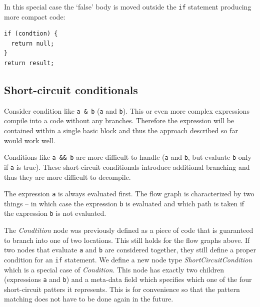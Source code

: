\documentclass[12pt,twoside,notitlepage]{report}
\begin{document}
In this special case the `false' body is moved outside the \verb|if|
statement producing more compact code:
\begin{verbatim}
if (condtion) {
  return null;
}
return result;
\end{verbatim}


\subsection{Short-circuit conditionals}

Consider condition like \verb|a & b| (\verb|a| and \verb|b|).
This or even more complex expressions compile into a code without
any branches.  Therefore the expression will be contained within
a single basic block and thus the approach described so far 
would work well.

Conditions like \verb|a && b| are more difficult to handle 
(\verb|a| and \verb|b|, but evaluate \verb|b| only if \verb|a|
is true).  These short-circuit conditionals introduce additional
branching and thus they are more difficult to decompile.



The expression \verb|a| is always evaluated first.
The flow graph is characterized by two things -- in which case the 
expression \verb|b| is evaluated and which path is taken if the
expression \verb|b| is not evaluated.

The \emph{Condtition} node was previously defined as a piece of 
code that is guaranteed to branch into one of two locations.
This still holds for the flow graphs above.  If two nodes 
that evaluate \verb|a| and \verb|b| are considered together,
they still define a proper condition for an \verb|if| statement.
We define a new node type \emph{ShortCircuitCondition}
which is a special case of \emph{Condition}.  
This node has exactly two children (expressions \verb|a| and 
\verb|b|) and a meta-data field which specifies which one of 
the four short-circuit patters it represents.  This is for
convenience so that the pattern matching does not have to be
done again in the future.
\end{document}
